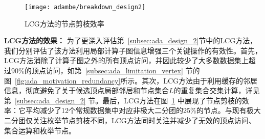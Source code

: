 \begin{figure} [t]
	\centering
	\texttt{[image: adambe/breakdown\_design2]}
	\caption{LCG方法的节点剪枝效率}

	\label{fig:ada_breakdown_design2}
\end{figure}


\textbf{LCG方法的效果：} 为了更深入评估第~\ref{subsec:ada_design_2}节中的LCG方法，我们分别评估了该方法利用局部计算子图信息增强三个关键操作的有效性。首先，LCG方法消除了计算子图之外的所有顶点访问，并因此较少了大多数数据集上超过90\%的顶点访问，如第~\ref{subsec:ada_limitation_vertex} 节的图~\ref{fig:ada_motivation_redundancy}所示。其次，LCG方法由于利用缓存的邻居信息，彻底避免了关于候选顶点局部邻居和节点集合$L$的重复集合交集计算，详见第~\ref{subsec:ada_design_2} 节。最后，LCG方法在图~\ref{fig:ada_breakdown_design2} 中展现了节点剪枝的效率：它平均减少了12个常规数据集中对应非极大二分团的25\%的节点。与现有极大二分团仅关注枚举节点剪枝不同，LCG方法同时关注并减少了无效的顶点访问、集合运算和枚举节点。







